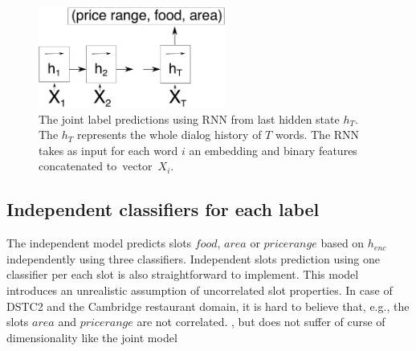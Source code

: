 \documentclass{itatnew}
\def\OD#1{{\color{darkgreen}OD: \it #1}}
\def\ODdel#1{\bgroup\markoverwith{\textcolor{darkgreen}{\rule[0.5ex]{2pt}{1pt}}}\ULon{#1}}
\begin{document}
\begin{figure}
\begin{center}
\includegraphics[height=9em]{encoder_joint}
\caption{The joint label predictions using RNN from last hidden state $h_T$. The $h_T$ represents the whole dialog history of $T$ words. The RNN takes as input for each word $i$ an embedding and binary features concatenated to~vector~$X_{i}$.}
\end{center}
\vspace{-0.70em}
\label{fig:encjoint}
\end{figure}

\subsection{Independent classifiers for each label}
\label{sec:indep}
The independent model predicts slots $food$, $area$ or $price range$ based on $h_{enc}$ independently using three classifiers.
Independent slots prediction using one classifier per each slot is also straightforward to implement.  %
This model introduces an unrealistic assumption of uncorrelated slot properties.
In case of DSTC2 and the Cambridge restaurant domain, it is hard to believe that, e.g., the slots $area$ and $price range$ are not correlated.
, but does not suffer of curse of dimensionality like the joint model
\end{document}
